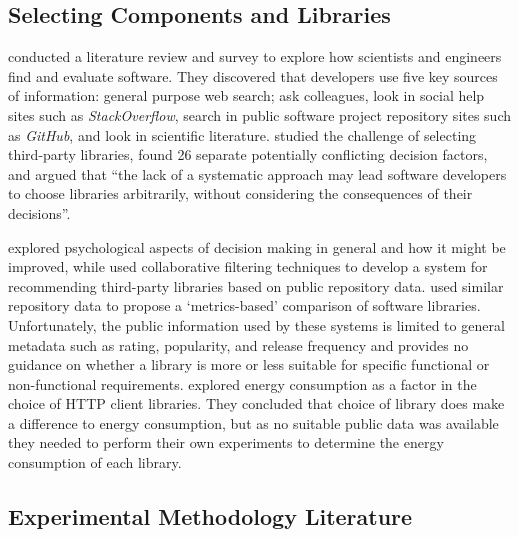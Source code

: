 \subsection{Selecting Components and Libraries}
\label{literature:selection and comparison}

\citet{Hucka2018} conducted a literature review and survey to explore how scientists and engineers find and evaluate software. They discovered that developers use five key sources of information: general purpose web search; ask colleagues, look in social help sites such as \emph{StackOverflow}, search in public software project repository sites such as \emph{GitHub}, and look in scientific literature. \citet{LariosVargas2020} studied the challenge of selecting third-party libraries, found 26 separate potentially conflicting decision factors, and argued that \enquote{the lack of a systematic approach may lead software developers to choose libraries arbitrarily, without considering the consequences of their decisions}.

\citet{Milkman2009} explored psychological aspects of decision making in general and how it might be improved, while \citet{Nguyen2020} used collaborative filtering techniques to develop a system for recommending third-party libraries based on public repository data. \citet{delaMora2018a} used similar repository data to propose a `metrics-based' comparison of software libraries. Unfortunately, the public information used by these systems is limited to general metadata such as rating, popularity, and release frequency and provides no guidance on whether a library is more or less suitable for specific functional or non-functional requirements. \citet{Anwar2020} explored energy consumption as a factor in the choice of HTTP client libraries. They concluded that choice of library does make a difference to energy consumption, but as no suitable public data was available they needed to perform their own experiments to determine the energy consumption of each library.

\subsection{Experimental Methodology Literature}
\label{literature:methods}

